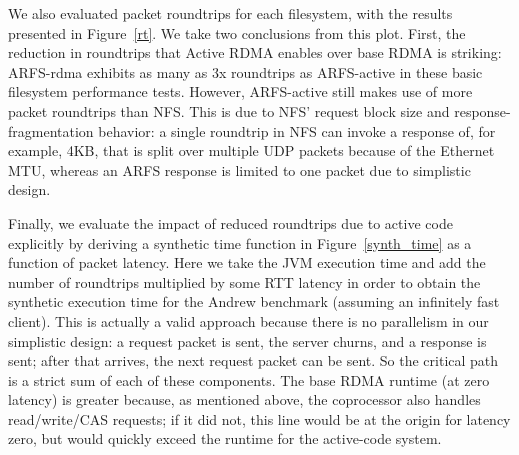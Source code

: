 \documentclass[10pt]{article}
\begin{document}
We also evaluated packet roundtrips for each filesystem, with the
results presented in Figure~\ref{rt}. We take two conclusions from
this plot. First, the reduction in roundtrips that Active RDMA enables
over base RDMA is striking: ARFS-rdma exhibits as many as 3x
roundtrips as ARFS-active in these basic filesystem performance
tests. However, ARFS-active still makes use of more packet roundtrips
than NFS. This is due to NFS' request block size and
response-fragmentation behavior: a single roundtrip in NFS can invoke
a response of, for example, 4KB, that is split over multiple UDP
packets because of the Ethernet MTU, whereas an ARFS response is
limited to one packet due to simplistic design.

Finally, we evaluate the impact of reduced roundtrips due to active
code explicitly by deriving a synthetic time function in
Figure~\ref{synth_time} as a function of packet latency. Here we take
the JVM execution time and add the number of roundtrips multiplied by
some RTT latency in order to obtain the synthetic execution time for
the Andrew benchmark (assuming an infinitely fast client). This is
actually a valid approach because there is no parallelism in our
simplistic design: a request packet is sent, the server churns, and a
response is sent; after that arrives, the next request packet can be
sent. So the critical path is a strict sum of each of these
components. The base RDMA runtime (at zero latency) is greater
because, as mentioned above, the coprocessor also handles
read/write/CAS requests; if it did not, this line would be at the
origin for latency zero, but would quickly exceed the runtime for the
active-code system.
\end{document}
